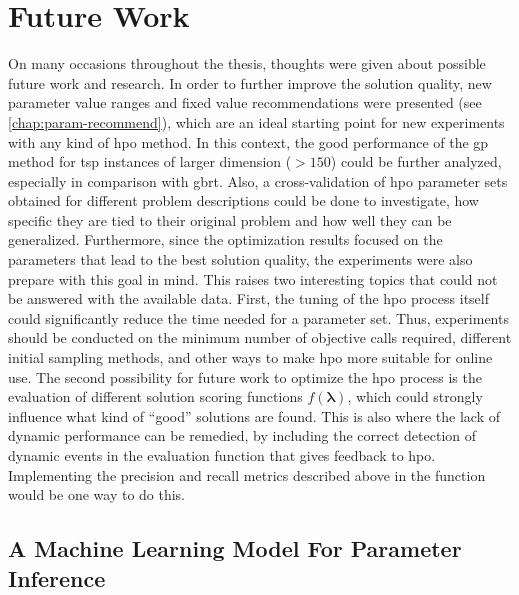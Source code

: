 \section{Future Work}

On many occasions throughout the thesis, thoughts were given about possible future work and research. 
In order to further improve the solution quality, new parameter value ranges and fixed value recommendations were presented (see \cref{chap:param-recommend}), which are an ideal starting point for new experiments with any kind of \gls{hpo} method. In this context, the good performance of the \gls{gp} method for \gls{tsp} instances of larger dimension ($>150$) could be further analyzed, especially in comparison with \gls{gbrt}. Also, a cross-validation of \gls{hpo} parameter sets obtained for different problem descriptions could be done to investigate, how specific they are tied to their original problem and how well they can be generalized. Furthermore, since the optimization results focused on the parameters that lead to the best solution quality, the experiments were also prepare with this goal in mind. This raises two interesting topics that could not be answered with the available data. First, the tuning of the \gls{hpo} process itself could significantly reduce the time needed for a parameter set. Thus, experiments should be conducted on the minimum number of objective calls required, different initial sampling methods, and other ways to make \gls{hpo} more suitable for online use. The second possibility for future work to optimize the \gls{hpo} process is the evaluation of different solution scoring functions $f(\mathbf{\lambda})$, which could strongly influence what kind of \enquote{good} solutions are found. This is also where the lack of dynamic performance can be remedied, by including the correct detection of dynamic events in the evaluation function that gives feedback to \gls{hpo}. Implementing the precision and recall metrics described above in the function would be one way to do this.

\subsection{A Machine Learning Model For Parameter Inference}

